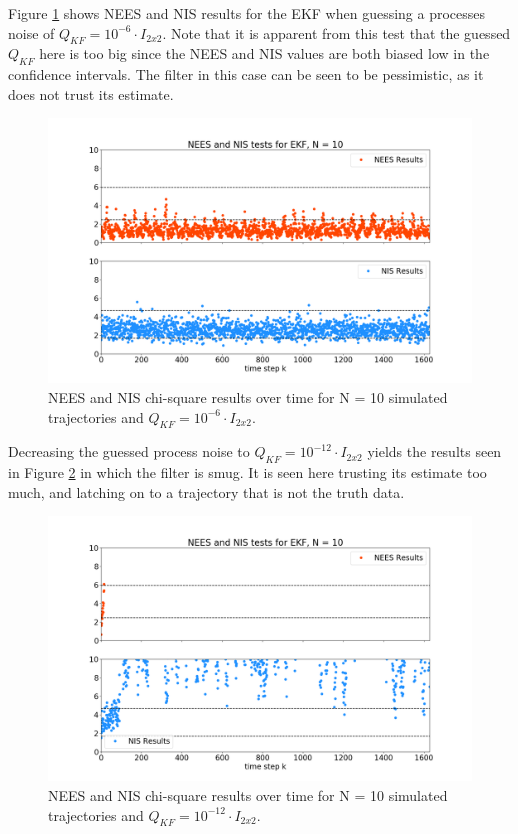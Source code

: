 \documentclass[11pt, a4paper]{article}
\begin{document}
Figure \ref{fig:neesnis_ekf_Qbig} shows NEES and NIS results for the EKF when guessing a processes noise of $Q_{KF} = 10^{-6} \cdot I_{2 x 2}$. 
Note that it is apparent from this test that the guessed $Q_{KF}$ here is too big since the NEES and NIS values are both biased low in the confidence intervals. 
The filter in this case can be seen to be pessimistic, as it does not trust its estimate. 
\begin{figure}[H]
	\centering
	\includegraphics[width=\textwidth]{./Figures/NEESNIS_ekf_N10Q1.0E-06.png}
	\caption{NEES and NIS chi-square results over time for N = 10 simulated trajectories and $Q_{KF} = 10^{-6} \cdot I_{2 x 2}$.}
	\label{fig:neesnis_ekf_Qbig}
\end{figure}


Decreasing the guessed process noise to $Q_{KF}= 10^{-12} \cdot I_{2 x 2}$ yields the results seen in Figure \ref{fig:neesnis_ekf_Qsmall} in which the filter is smug. 
It is seen here trusting its estimate too much, and latching on to a trajectory that is not the truth data. 
\begin{figure}[H]
	\centering
	\includegraphics[width=\textwidth]{./Figures/NEESNIS_ekf_N10Q1.0E-12.png}
	\caption{NEES and NIS chi-square results over time for N = 10 simulated trajectories and $Q_{KF} = 10^{-12} \cdot I_{2 x 2}$.}
	\label{fig:neesnis_ekf_Qsmall}
\end{figure}
\end{document}
